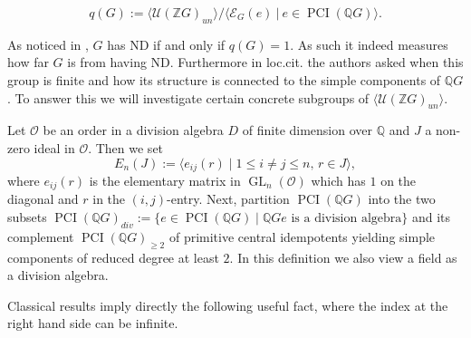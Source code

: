 \documentclass[a4paper,10pt]{amsart}
\theoremstyle{definition}
\theoremstyle{remark}
\newcommand{\GL}{\operatorname{GL}}
\newcommand\PCI{\operatorname{PCI}}
\renewcommand{\O}{\mathcal{O}}
\newcommand{\U}{{\mathcal U}}
\newcommand{\Z}{{\mathbb Z}}
\newcommand{\Q}{{\mathbb Q}}
\begin{document}
\begin{equation}\label{def: q(G) group}
q(G) := \langle  \U(\Z G)_{un} \rangle / \langle \mathcal{E}_G(e) \ | \ e \in \PCI(\Q G) \rangle.
\end{equation}


As noticed in \cite[Section 6]{JespersSun}, $G$ has ND if and only if $q(G) = 1.$ As such it indeed measures how far $G$ is from having ND. Furthermore in loc.cit. the authors asked when this group is finite and how its structure is connected to the simple components of $\Q G$. To answer this we will investigate certain concrete subgroups of $\langle  \U(\Z G)_{un} \rangle$.

Let $\O$ be an order in a division algebra $D$ of finite dimension over $\Q$ and $J$ a non-zero ideal in $\O$. Then we set
$$E_n(J) := \langle e_{ij}(r) \mid 1 \leq i \neq j \leq n, \, r \in J \rangle, $$
where $e_{ij}(r)$ is the elementary matrix in $\GL_n(\O)$ which has $1$ on the diagonal and $r$ in the $(i,j)$-entry. Next, partition $\PCI(\Q G)$ into the two subsets 
$\PCI(\Q G)_{div} := \{ e \in \PCI(\Q G) \mid \Q Ge \text{ is a division algebra}\}$
and its complement $\PCI(\Q G)_{\geq 2}$ of primitive central idempotents yielding simple components of reduced degree at least $2$. In this definition we also view a field as a division algebra.

Classical results imply directly the following useful fact, where the index at the right hand side can be infinite.
\end{document}
